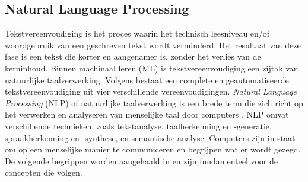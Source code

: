 

\subsection{Natural Language Processing}

Tekstvereenvoudiging is het proces waarin het technisch leesniveau en/of woordgebruik van een geschreven tekst wordt verminderd. Het resultaat van deze fase is een tekst die korter en aangenamer is, zonder het verlies van de kerninhoud. Binnen machinaal leren (ML) is tekstvereenvoudiging een zijtak van natuurlijke taalverwerking. \autocite{Siddharthan2006} Volgens \autocite{Siddharthan2014} bestaat een complete en geautomatiseerde tekstvereenvoudiging uit vier verschillende vereenvoudigingen. \textit{Natural Language Processing} (NLP) of natuurlijke taalverwerking is een brede term die zich richt op het verwerken en analyseren van menselijke taal door computers \autocite{Eisenstein2019}. NLP omvat verschillende technieken, zoals tekstanalyse, taalherkenning en -generatie, spraakherkenning en -synthese, en semantische analyse. Computers zijn in staat om op een menselijke manier te communiceren en begrijpen wat er wordt gezegd. De volgende begrippen worden aangehaald in \textcite{Sohom2019, Eisenstein2019} en zijn fundamenteel voor de concepten die volgen.


